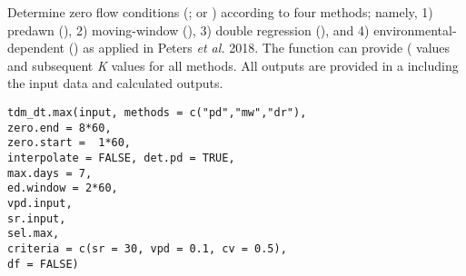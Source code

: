 \documentclass[a4paper]{book}
\begin{document}
%
\begin{Description}\relax
Determine zero flow conditions (; or )
according to four methods; namely,
1) predawn (),
2) moving-window (),
3) double regression (),
and 4) environmental-dependent () as applied in Peters \emph{et al.} 2018.
The function can provide ( values and subsequent \emph{K} values for all methods.
All outputs are provided in a  including the input data and calculated outputs.
\end{Description}
%
\begin{Usage}
\begin{verbatim}
tdm_dt.max(input, methods = c("pd","mw","dr"),
zero.end = 8*60,
zero.start =  1*60,
interpolate = FALSE, det.pd = TRUE,
max.days = 7,
ed.window = 2*60,
vpd.input,
sr.input,
sel.max,
criteria = c(sr = 30, vpd = 0.1, cv = 0.5),
df = FALSE)
\end{verbatim}
\end{Usage}
%
\end{document}
